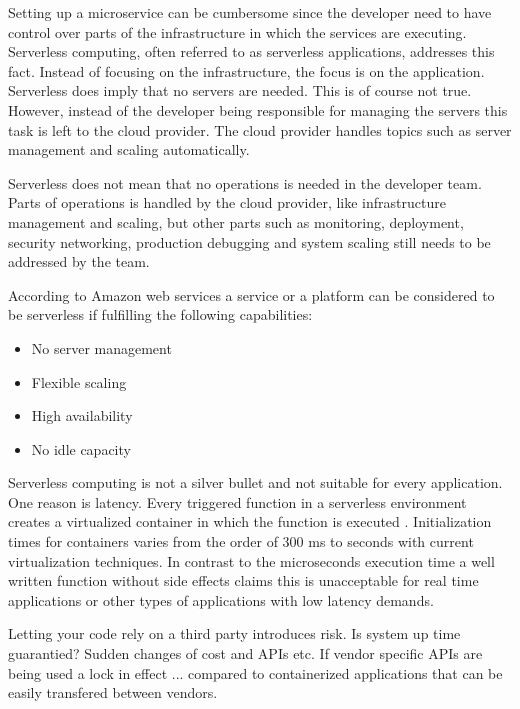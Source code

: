 Setting up a microservice can be cumbersome since the developer need to have control over parts of the infrastructure in which the services are executing. Serverless computing, often referred to as serverless applications, addresses this fact. Instead of focusing on the infrastructure, the focus is on the application. Serverless does imply that no servers are needed. This is of course not true. However, instead of the developer being responsible for managing the servers this task is left to the cloud provider. The cloud provider handles topics such as server management and scaling automatically.

Serverless does not mean that no operations is needed in the developer team. Parts of operations is handled by the cloud provider, like infrastructure management and scaling, but other parts such as monitoring, deployment, security networking, production debugging and system scaling still needs to be addressed by the team. \cite{MikeRoberts2016}

According to Amazon web services a service or a platform can be considered to be serverless if fulfilling the following capabilities\cite{Vogels2016}:
\begin{itemize}
\item No server management
\item Flexible scaling
\item High availability
\item No idle capacity
\end{itemize}


Serverless computing is not a silver bullet and not suitable for every application. One reason is latency. Every triggered function in a serverless environment creates a virtualized container in which the function is executed \cite{NeilSavage2018}. Initialization times for containers varies from the order of 300 ms to seconds \cite{} with current virtualization techniques. In contrast to the microseconds execution time a well written function without side effects claims this is unacceptable for real time applications or other types of applications with low latency demands. 


Letting your code rely on a third party introduces risk. Is system up time guarantied? Sudden changes of cost and APIs etc. \cite{MikeRoberts2016}
If vendor specific APIs are being used a lock in effect ... compared to containerized applications that can be easily transfered between vendors.\cite{} 


